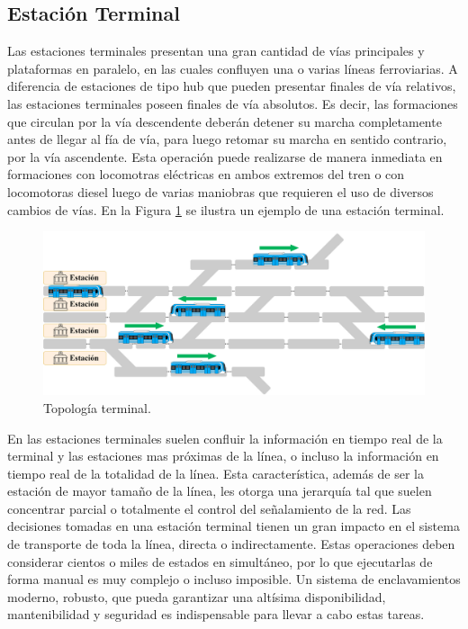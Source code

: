 \subsection{Estación Terminal}

Las estaciones terminales presentan una gran cantidad de vías principales y plataformas en paralelo, en las cuales confluyen una o varias líneas ferroviarias. A diferencia de estaciones de tipo hub que pueden presentar finales de vía relativos, las estaciones terminales poseen finales de vía absolutos. Es decir, las formaciones que circulan por la vía descendente deberán detener su marcha completamente antes de llegar al fía de vía, para luego retomar su marcha en sentido contrario, por la vía ascendente. Esta operación puede realizarse de manera inmediata en formaciones con locomotras eléctricas en ambos extremos del tren o con locomotoras diesel luego de varias maniobras que requieren el uso de diversos cambios de vías. En la Figura \ref{fig:terminal_1} se ilustra un ejemplo de una estación terminal.

    \begin{figure}[H]
        \centering
        \includegraphics[width=1\textwidth]{Figuras/terminal}
        \centering\caption{Topología terminal.}
        \label{fig:terminal_1}
    \end{figure}

En las estaciones terminales suelen confluir la información en tiempo real de la terminal y las estaciones mas próximas de la línea, o incluso la información en tiempo real de la totalidad de la línea. Esta característica, además de ser la estación de mayor tamaño de la línea, les otorga una jerarquía tal que suelen concentrar parcial o totalmente el control del señalamiento de la red. Las decisiones tomadas en una estación terminal tienen un gran impacto en el sistema de transporte de toda la línea, directa o indirectamente. Estas operaciones deben considerar cientos o miles de estados en simultáneo, por lo que ejecutarlas de forma manual es muy complejo o incluso imposible. Un sistema de enclavamientos moderno, robusto, que pueda garantizar una altísima disponibilidad, mantenibilidad y seguridad es indispensable para llevar a cabo estas tareas.